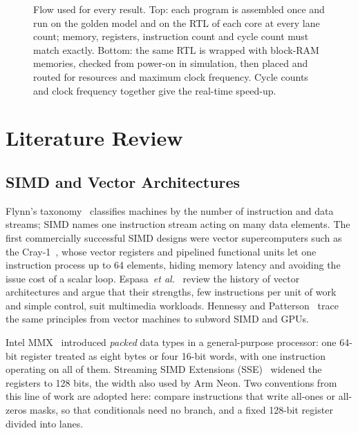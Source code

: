 \begin{figure}[t]
\centering

\caption{Flow used for every result. Top: each program is assembled once and run on the
golden model and on the RTL of each core at every lane count; memory, registers,
instruction count and cycle count must match exactly. Bottom: the same RTL is wrapped
with block-RAM memories, checked from power-on in simulation, then placed and routed for
resources and maximum clock frequency. Cycle counts and clock frequency together give
the real-time speed-up.}
\label{fig:flow}
\end{figure}

\section{Literature Review}\label{sec:lit}

\subsection{SIMD and Vector Architectures}
Flynn's taxonomy~\cite{flynn72} classifies machines by the number of instruction and
data streams; SIMD names one instruction stream acting on many data elements. The first
commercially successful SIMD designs were vector supercomputers such as the
Cray-1~\cite{cray1}, whose vector registers and pipelined functional units let one
instruction process up to 64 elements, hiding memory latency and avoiding the issue cost
of a scalar loop. Espasa~\emph{et al.}~\cite{espasa98} review the history of vector
architectures and argue that their strengths, few instructions per unit of work and
simple control, suit multimedia workloads. Hennessy and Patterson~\cite{hp6} trace the
same principles from vector machines to subword SIMD and GPUs.

Intel MMX~\cite{mmx} introduced \emph{packed} data types in a general-purpose
processor: one 64-bit register treated as eight bytes or four 16-bit words, with one
instruction operating on all of them. Streaming SIMD Extensions (SSE)~\cite{sse}
widened the registers to 128 bits, the width also used by Arm Neon. Two conventions
from this line of work are adopted here: compare instructions that write all-ones or
all-zeros masks, so that conditionals need no branch, and a fixed 128-bit register
divided into lanes.

